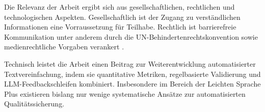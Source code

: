 Die Relevanz der Arbeit ergibt sich aus gesellschaftlichen, rechtlichen und technologischen Aspekten. Gesellschaftlich ist der Zugang zu verständlichen Informationen eine Vorraussetzung für Teilhabe. Rechtlich ist barrierefreie Kommunikation unter anderem durch die UN-Behindertenrechtskonvention sowie medienrechtliche Vorgaben verankert \cite{}.

Technisch leistet die Arbeit einen Beitrag zur Weiterentwicklung automatisierter Textvereinfachung, indem sie quantitative Metriken, regelbasierte Validierung und LLM-Feedbackschleifen kombiniert. Insbesondere im Bereich der Leichten Sprache Plus existieren bislang nur wenige systematische Ansätze zur automatisierten Qualitätssicherung.